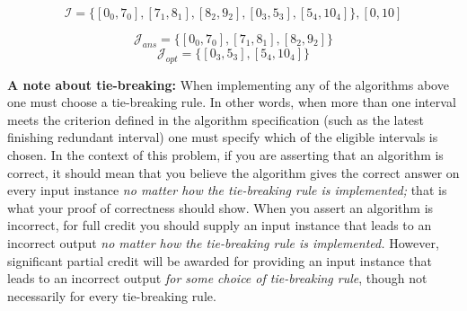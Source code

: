 \documentclass{hw}
\begin{document}
\begin{problem}
\begin{solution}
$$
\mathcal{I} = \{[0_0,7_0], [7_1,8_1], [8_2,9_2], [0_3,5_3], [5_4,10_4]\}, [0,10]
$$

$$
\mathcal{J}_{ans} = \{[0_0,7_0], [7_1,8_1], [8_2,9_2]\}
$$
$$
\mathcal{J}_{opt} = \{[0_3,5_3], [5_4,10_4]\}
$$
\end{solution}

{\bf A note about tie-breaking:}
When implementing any of the algorithms above one must
choose a tie-breaking rule. In other words, when more than
one interval meets the criterion defined in the algorithm
specification (such as the latest finishing redundant
interval) one must specify which of the eligible
intervals is chosen. In the context of this problem,
if you are asserting that an algorithm is correct,
it should mean that you believe the algorithm gives
the correct answer on every input instance
{\em no matter how the tie-breaking rule is implemented;}
that is what your proof of correctness should show.
When you assert an algorithm is incorrect,
for full credit you should supply an input instance
that leads to an incorrect output {\em no matter how
the tie-breaking rule is implemented.} However,
significant partial credit will be awarded for
providing an input instance that leads to an incorrect
output {\em for some choice of tie-breaking rule},
though not necessarily for every tie-breaking rule.

\end{problem}
\newpage

\newcommand{\rank}{\textnormal{rank}}
\newcommand{\Colon}{:}
\newcommand{\dotdot}{..}
\newcommand{\numinv}{\textrm{NI}}
\newcommand{\numlargeinv}{\textrm{NLI}}
\end{document}
